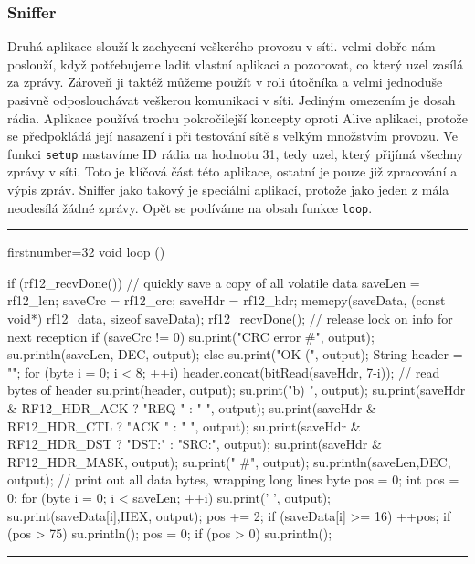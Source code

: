 \documentclass[12pt,titlepage]{article}
\newcommand{\codetitle}[1]{\bigskip \noindent {\scriptsize #1}\hrule}
\begin{document}
		\subsubsection{Sniffer}
		Druhá aplikace slouží k zachycení veškerého provozu v síti. velmi dobře nám poslouží, když potřebujeme ladit vlastní aplikaci a pozorovat, co který uzel zasílá za zprávy. Zároveň ji taktéž můžeme použít v roli útočníka a velmi jednoduše pasivně odposlouchávat veškerou komunikaci v síti. Jediným omezením je dosah rádia. Aplikace používá trochu pokročilejší koncepty oproti Alive aplikaci, protože se předpokládá její nasazení i při testování sítě s velkým množstvím provozu. Ve funkci \texttt{setup} nastavíme ID rádia na hodnotu 31, tedy uzel, který přijímá všechny zprávy v síti. Toto je klíčová část této aplikace, ostatní je pouze již zpracování a výpis zpráv. Sniffer jako takový je speciální aplikací, protože jako jeden z mála neodesílá žádné zprávy. Opět se podíváme na obsah funkce \texttt{loop}.
\newpage
\codetitle{Funkce \texttt{loop} v aplikaci Sniffer}
\begin{cppcode*}{firstnumber=32}
void loop () {

    if (rf12_recvDone()) {
        // quickly save a copy of all volatile data saveLen = rf12_len;
        saveCrc = rf12_crc;
        saveHdr = rf12_hdr;
        memcpy(saveData, (const void*) rf12_data, sizeof saveData);
        rf12_recvDone();
        // release lock on info for next reception
        if (saveCrc != 0) {
            su.print("CRC error #", output);
            su.println(saveLen, DEC, output);
        }
        else {
            su.print("OK (", output);
            String header = "";
            for (byte i = 0; i < 8; ++i) {
                header.concat(bitRead(saveHdr, 7-i)); // read bytes of header
            }
            su.print(header, output);
            su.print("b) ", output);
            su.print(saveHdr & RF12_HDR_ACK ? "REQ " : " ", output);
            su.print(saveHdr & RF12_HDR_CTL ? "ACK " : " ", output);
            su.print(saveHdr & RF12_HDR_DST ? "DST:" : "SRC:", output);
            su.print(saveHdr & RF12_HDR_MASK, output);
            su.print(" #", output);
            su.println(saveLen,DEC, output);
            // print out all data bytes, wrapping long lines byte pos = 0;
            int pos = 0;
            for (byte i = 0; i < saveLen; ++i) {
                su.print(' ', output);
                su.print(saveData[i],HEX, output);
                pos += 2;
                if (saveData[i] >= 16) ++pos;
                if (pos > 75) {
                    su.println();
                    pos = 0;
                }
            }
            if (pos > 0) su.println();
        }
    }
}
\end{cppcode*}
\hrule
\bigskip
\end{document}
